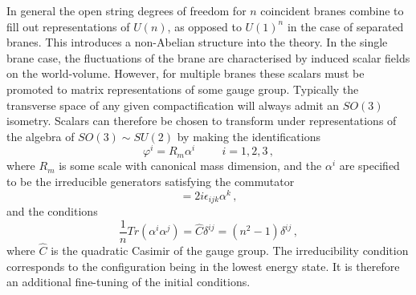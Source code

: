 In general the open string degrees of freedom for $n$ coincident branes 
combine to fill out representations of $U(n)$, as opposed to $U(1)^n$ 
in the case of separated branes. This introduces a non-Abelian 
structure into the theory. In the single brane case, the fluctuations of the 
brane are characterised by induced scalar fields on the world-volume. 
However, for multiple branes
these scalars must be promoted to matrix representations of some gauge group. 
% 
Typically the transverse space of any given compactification will always admit
an $SO(3)$ isometry. Scalars can therefore be chosen to 
transform under representations of the algebra of $SO(3) \sim SU(2)$ by making 
the identifications
% 
\begin{equation}
\varphi^i = R_m \alpha^i \hspace{1cm} i =1, 2, 3 \,,
\end{equation}
% 
where $R_m$ is some scale with canonical mass dimension, and the $\alpha^i$ are
specified to be the irreducible generators satisfying the commutator
% 
\begin{equation}
[\alpha^i, \alpha^j] = 2i \epsilon_{ijk} \alpha^k \,,
\end{equation}
% 
and the conditions
% 
\begin{equation}
\frac{1}{n} Tr(\alpha^i \alpha^j) = \hat{C} \delta^{ij} = (n^2-1) \delta^{ij}
\,,
\end{equation}
% 
where $\hat{C}$ is the quadratic Casimir of the gauge group.
The irreducibility condition corresponds to the configuration being in the
lowest energy state. It is therefore an additional fine-tuning
of the initial conditions. 


